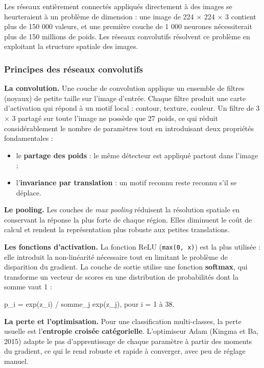 \documentclass[10pt,a4paper]{article}
\begin{document}
Les réseaux entièrement connectés appliqués directement à des images se heurteraient à un problème de dimension : une image de 224 $\times$ 224 $\times$ 3 contient plus de 150 000 valeurs, et une première couche de 1 000 neurones nécessiterait plus de 150 millions de poids. Les réseaux convolutifs résolvent ce problème en exploitant la structure spatiale des images.

\subsubsection{Principes des réseaux convolutifs}

\textbf{La convolution.} Une couche de convolution applique un ensemble de filtres (noyaux) de petite taille sur l'image d'entrée. Chaque filtre produit une carte d'activation qui répond à un motif local : contour, texture, couleur. Un filtre de 3 $\times$ 3 partagé sur toute l'image ne possède que 27 poids, ce qui réduit considérablement le nombre de paramètres tout en introduisant deux propriétés fondamentales :

\begin{itemize}
\item le \textbf{partage des poids} : le même détecteur est appliqué partout dans l'image ;
\item l'\textbf{invariance par translation} : un motif reconnu reste reconnu s'il se déplace.
\end{itemize}

\textbf{Le pooling.} Les couches de \emph{max pooling} réduisent la résolution spatiale en conservant la réponse la plus forte de chaque région. Elles diminuent le coût de calcul et rendent la représentation plus robuste aux petites translations.

\textbf{Les fonctions d'activation.} La fonction ReLU (\texttt{max(0, x)}) est la plus utilisée : elle introduit la non-linéarité nécessaire tout en limitant le problème de disparition du gradient. La couche de sortie utilise une fonction \textbf{softmax}, qui transforme un vecteur de scores en une distribution de probabilités dont la somme vaut 1 :

p\_i = exp(z\_i) / somme\_j exp(z\_j), pour i = 1 à 38.

\textbf{La perte et l'optimisation.} Pour une classification multi-classes, la perte usuelle est l'\textbf{entropie croisée catégorielle}. L'optimiseur Adam (Kingma et Ba, 2015) adapte le pas d'apprentissage de chaque paramètre à partir des moments du gradient, ce qui le rend robuste et rapide à converger, avec peu de réglage manuel.
\end{document}
